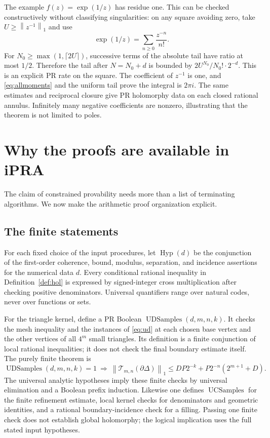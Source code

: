 \documentclass[11pt]{article}
\theoremstyle{definition}
\newcommand{\norm}[1]{\left\lVert#1\right\rVert_1}
\newcommand{\trap}{\mathcal T}
\newcommand{\bd}{\partial}
\begin{document}
The example \(f(z)=\exp(1/z)\) has residue one. This can be checked
constructively without classifying singularities: on any square avoiding
zero, take \(U\ge\norm{z^{-1}}\) and use
\[
 \exp(1/z)=\sum_{n\ge0}\frac{z^{-n}}{n!}.
\]
For \(N_0\ge\max(1,\lceil2U\rceil)\), successive terms of the
absolute tail have ratio at most \(1/2\). Therefore the tail after
\(N=N_0+d\) is bounded by
\(2U^{N_0}/N_0!\cdot2^{-d}\). This is an explicit PR rate on the
square. The coefficient of \(z^{-1}\) is one, and
\eqref{eq:allmoments} and the uniform tail prove the integral is
\(2\pi i\). The same estimates and reciprocal closure give PR
holomorphy data on each closed rational annulus. Infinitely many negative
coefficients are nonzero, illustrating that the theorem is not limited
to poles.

\section{Why the proofs are available in iPRA}\label{sec:ipraaccounting}

The claim of constrained provability needs more than a list of
terminating algorithms. We now make the arithmetic proof organization
explicit.

\subsection{The finite statements}

For each fixed choice of the input procedures, let
\(\operatorname{Hyp}(d)\) be the conjunction of the first-order
coherence, bound, modulus, separation, and incidence assertions for the
numerical data \(d\). Every conditional rational inequality in
Definition~\ref{def:hol} is expressed by signed-integer cross
multiplication after checking positive denominators. Universal
quantifiers range over natural codes, never over functions or sets.

For the triangle kernel, define a PR Boolean
\(\operatorname{UDSamples}(d,m,n,k)\). It checks the mesh inequality
and the instances of \eqref{eq:ud} at each chosen base vertex and the
other vertices of all \(4^m\) small triangles. Its definition is a
finite conjunction of local rational inequalities; it does not check
the final boundary estimate itself. The purely finite theorem is
\begin{equation}\label{eq:finitearith}
 \operatorname{UDSamples}(d,m,n,k)=1
 \ \Longrightarrow\
 \norm{\trap_{m,n}(\bd\Delta)}
 \le DP2^{-k}+P2^{-n}(2^{m+1}+D).
\end{equation}
The universal analytic hypotheses imply these finite checks by
universal elimination and a Boolean prefix induction.
Likewise one defines \(\operatorname{UCSamples}\) for the finite
refinement estimate, local kernel checks for denominators and geometric
identities, and a rational boundary-incidence check for a filling.
Passing one finite check does not establish global holomorphy; the
logical implication uses the full stated input hypotheses.
\end{document}
